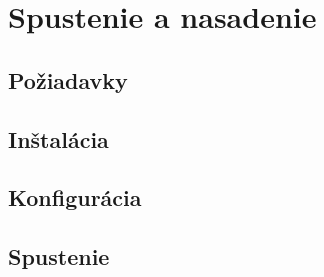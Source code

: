 \chapter{Spustenie a nasadenie}


\section{Požiadavky}


\section{Inštalácia}


\section{Konfigurácia}


\section{Spustenie}

